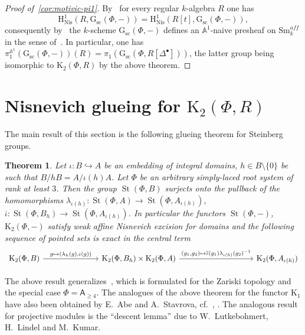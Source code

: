 \documentclass[oneside, 11pt]{amsart} \pdfoutput=1
\newcommand{\K}{{\mathrm{K}}}
\newcommand{\St}{\mathop{\mathrm{St}}\nolimits}
\newcommand{\Gsc}{\mathrm{G}_\mathrm{sc}}
\numberwithin{equation}{section}
\newtheorem{theorem}[lemma]{Theorem}
\theoremstyle{definition}
\newcommand{\rA}{\mathsf{A}}
\begin{document}
\begin{proof}[Proof of~\cref{cor:motivic-pi1}] 
 By~\cite[Corollary~5.4]{Sta20} for every regular $k$-algebra $R$ one has \[\mathrm H^1_\mathrm{Nis}(R, \Gsc(\Phi, -)) = \mathrm H^1_\mathrm{Nis}(R[t], \Gsc(\Phi, -)),\] consequently by~\cite[Theorem~2.4.2]{AHW18} the $k$-scheme $\Gsc(\Phi, -)$ defines an $\mathbb{A}^1$-naive presheaf on $\mathrm{Sm}_k^{aff}$ in the sense of~\cite[Definition~2.1.1]{AHW18}.
 In particular, one has $\pi_1^{\mathbb{A}^1}(\Gsc(\Phi, -))(R) = \pi_1(\Gsc(\Phi, R[\Delta^\bullet]))$, the latter group being isomorphic to $\K_2(\Phi, R)$ by the above theorem.
\end{proof}

\section{Nisnevich glueing for \texorpdfstring{$\K_2(\Phi, R)$}{K2(Ф,R)}} \label{sec:patching}
The main result of this section is the following glueing theorem for Steinberg groups.
\begin{theorem}\label{glueing}
Let $\iota\colon B \hookrightarrow A$ be an embedding of integral domains, $h\in B \setminus \{0\}$ be such that $B / hB = A / \iota(h)A$. Let $\Phi$ be an arbitrary simply-laced root system of rank at least $3$.
Then the group $\St(\Phi, B)$ surjects onto the pullback of the homomorphisms 
$\lambda_{\iota(h)}\colon \St(\Phi, A) \to \St(\Phi, A_{\iota(h)})$, $\overline{\iota}\colon\St(\Phi, B_h) \to \St(\Phi, A_{\iota(h)})$. In particular the functors $\St(\Phi, -)$, $\K_2(\Phi, -)$ satisfy weak affine Nisnevich excision for domains and the following sequence of pointed sets is exact in the central term
\begin{equation} \begin{tikzcd} \K_2(\Phi, B) \ar{rrr}{g \mapsto (\lambda_h(g), \iota(g))} & &  & \K_2(\Phi, B_h) \times \K_2(\Phi, A) \ar{rrrr}{(g_1,g_2) \mapsto \overline{\iota}(g_1) \lambda_{\iota(h)}(g_2)^{-1}} & & & & \K_2(\Phi, A_{\iota(h)}) \end{tikzcd} \end{equation}
\end{theorem}
The above result generalizes~\cite[Proposition~1.4]{Tu83}, which is formulated for the Zariski topology and the special case $\Phi=\rA_{\geq 4}$.
The analogues of the above theorem for the functor $\K_1$ have also been obtained by E.~Abe and A.~Stavrova, cf.~\cite[Lemma~3.7]{Abe83}, \cite[Lemma~3.4]{Sta14}.
The analogous result for projective modules is the ``descent lemma'' \cite[Lemma~4.7]{Bh99} due to W.~Lutkebohmert, H.~Lindel and M.~Kumar. 
\end{document}
